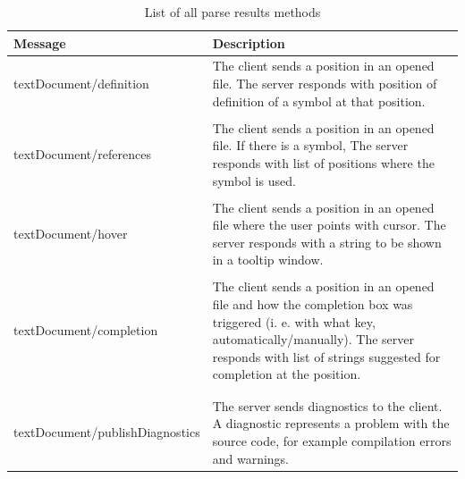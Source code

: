 \begin{table}
	\centering
	\begin{tabular}{ll}
		
		\toprule
		Message & Description \\ \midrule
		& \multirow{3}{9cm}{The client sends a position in an opened file. The server responds with position of definition of a symbol at that position.} \\
		textDocument/definition &  \\
		& \\
		& \\
		& \multirow{3}{9cm}{The client sends a position in an opened file. If there is a symbol, The server responds with list of positions where the symbol is used.}\\
		textDocument/references & \\
		& \\
		& \\
		& \multirow{3}{9cm}{The client sends a position in an opened file where the user points with cursor. The server responds with a string to be shown in a tooltip window.}\\
		textDocument/hover & \\
		& \\
		& \\
		& \multirow{3}{9cm}{The client sends a position in an opened file and how the completion box was triggered (i. e. with what key, automatically/manually). The server responds with list of strings suggested for completion at the position.}\\
		textDocument/completion & \\
		& \\
		& \\
		& \\
		& \multirow{3}{9cm}{The server sends diagnostics to the client. A diagnostic represents a problem with the source code, for example compilation errors and warnings.}\\
		textDocument/publishDiagnostics & \\
		& \\ \bottomrule
	\end{tabular}
	
	\caption{List of all parse results methods}
	\label{lsp_parse_results}
\end{table}

